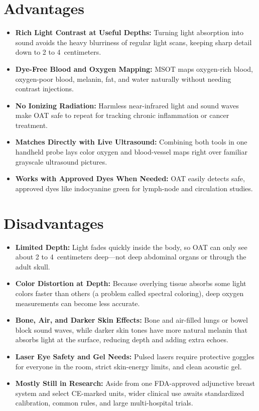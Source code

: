 \section{Advantages}
\begin{itemize}
  \item \textbf{Rich Light Contrast at Useful Depths:} Turning light absorption into sound avoids the heavy blurriness of regular light scans, keeping sharp detail down to 2 to 4~centimeters.
  \item \textbf{Dye-Free Blood and Oxygen Mapping:} MSOT maps oxygen-rich blood, oxygen-poor blood, melanin, fat, and water naturally without needing contrast injections.
  \item \textbf{No Ionizing Radiation:} Harmless near-infrared light and sound waves make OAT safe to repeat for tracking chronic inflammation or cancer treatment.
  \item \textbf{Matches Directly with Live Ultrasound:} Combining both tools in one handheld probe lays color oxygen and blood-vessel maps right over familiar grayscale ultrasound pictures.
  \item \textbf{Works with Approved Dyes When Needed:} OAT easily detects safe, approved dyes like indocyanine green for lymph-node and circulation studies.
\end{itemize}

\section{Disadvantages}
\begin{itemize}
  \item \textbf{Limited Depth:} Light fades quickly inside the body, so OAT can only see about 2 to 4~centimeters deep---not deep abdominal organs or through the adult skull.
  \item \textbf{Color Distortion at Depth:} Because overlying tissue absorbs some light colors faster than others (a problem called spectral coloring), deep oxygen measurements can become less accurate.
  \item \textbf{Bone, Air, and Darker Skin Effects:} Bone and air-filled lungs or bowel block sound waves, while darker skin tones have more natural melanin that absorbs light at the surface, reducing depth and adding extra echoes.
  \item \textbf{Laser Eye Safety and Gel Needs:} Pulsed lasers require protective goggles for everyone in the room, strict skin-energy limits, and clean acoustic gel.
  \item \textbf{Mostly Still in Research:} Aside from one FDA-approved adjunctive breast system and select CE-marked units, wider clinical use awaits standardized calibration, common rules, and large multi-hospital trials.
\end{itemize}

